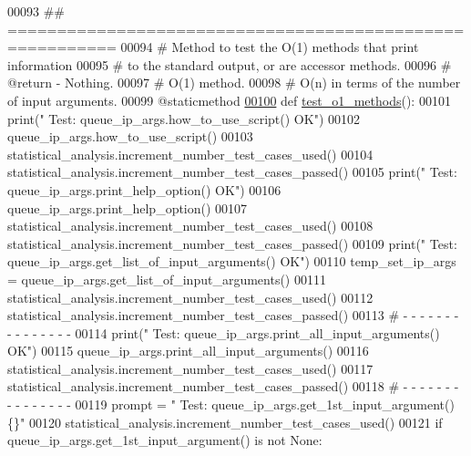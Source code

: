 \begin{DoxyCode}
00093     \textcolor{comment}{## =========================================================}
00094     \textcolor{comment}{#   Method to test the O(1) methods that print information}
00095     \textcolor{comment}{#       to the standard output, or are accessor methods.}
00096     \textcolor{comment}{#   @return - Nothing.}
00097     \textcolor{comment}{#   O(1) method.}
00098     \textcolor{comment}{#   O(n) in terms of the number of input arguments.}
00099     @staticmethod
\hypertarget{queue__ip__arguments__tester_8py_source_l00100}{}\hyperlink{classutilities_1_1queue__ip__arguments__tester_1_1queue__ip__args__tester_a49bd049dbf616cc1f604d3c0cbe84c43}{00100}     \textcolor{keyword}{def }\hyperlink{classutilities_1_1queue__ip__arguments__tester_1_1queue__ip__args__tester_a49bd049dbf616cc1f604d3c0cbe84c43}{test\_o1\_methods}():
00101         print(\textcolor{stringliteral}{" Test: queue\_ip\_args.how\_to\_use\_script()         OK"})
00102         queue\_ip\_args.how\_to\_use\_script()
00103         statistical\_analysis.increment\_number\_test\_cases\_used()
00104         statistical\_analysis.increment\_number\_test\_cases\_passed()
00105         print(\textcolor{stringliteral}{" Test: queue\_ip\_args.print\_help\_option()         OK"})
00106         queue\_ip\_args.print\_help\_option()
00107         statistical\_analysis.increment\_number\_test\_cases\_used()
00108         statistical\_analysis.increment\_number\_test\_cases\_passed()
00109         print(\textcolor{stringliteral}{" Test: queue\_ip\_args.get\_list\_of\_input\_arguments()   OK"})
00110         temp\_set\_ip\_args = queue\_ip\_args.get\_list\_of\_input\_arguments()
00111         statistical\_analysis.increment\_number\_test\_cases\_used()
00112         statistical\_analysis.increment\_number\_test\_cases\_passed()
00113         \textcolor{comment}{#   -   -   -   -   -   -   -   -   -   -   -   -   -   -   -}
00114         print(\textcolor{stringliteral}{" Test: queue\_ip\_args.print\_all\_input\_arguments()     OK"})
00115         queue\_ip\_args.print\_all\_input\_arguments()
00116         statistical\_analysis.increment\_number\_test\_cases\_used()
00117         statistical\_analysis.increment\_number\_test\_cases\_passed()
00118         \textcolor{comment}{#   -   -   -   -   -   -   -   -   -   -   -   -   -   -   -}
00119         prompt = \textcolor{stringliteral}{"  Test: queue\_ip\_args.get\_1st\_input\_argument()        \{\}"}
00120         statistical\_analysis.increment\_number\_test\_cases\_used()
00121         \textcolor{keywordflow}{if} queue\_ip\_args.get\_1st\_input\_argument() \textcolor{keywordflow}{is} \textcolor{keywordflow}{not} \textcolor{keywordtype}{None}:

\end{DoxyCode}
